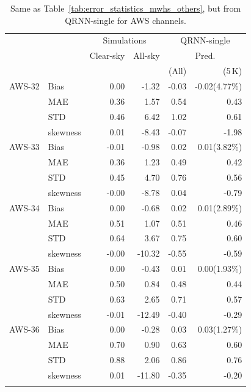 \documentclass[amt, manuscript]{copernicus}
\begin{document}
\begin{table}[t]
	\caption{Same as Table~\ref{tab:error_statistics_mwhs_others}, but from QRNN-single for AWS channels. }
	\label{tab:statistics_qrnn_aws}
	\begin{tabular}{llrr|rr}
		\tophline
		&&\multicolumn{2}{c|}{Simulations}& \multicolumn{2}{c}{QRNN-single} \\
		\cline{3-6}
		&&Clear-sky &   All-sky &  \multicolumn{2}{c}{Pred.}  \\
		&&   &    &   (All) & (5\,K) \\
		\middlehline
		AWS-32  &Bias      & 0.00 & -1.32 &  -0.03 & -0.02(4.77\%) \\
				&MAE      & 0.36 &  1.57 &   0.54 &  0.43 \\
				&STD      & 0.46 &  6.42 &   1.02 &  0.61 \\
				&skewness & 0.01 & -8.43 &  -0.07 & -1.98 \\
		\middlehline
		AWS-33	&Bias      & -0.01 & -0.98 &  0.02 &  0.01(3.82\%) \\
				&MAE      &  0.36 &  1.23 &  0.49 &  0.42 \\
				&STD      &  0.45 &  4.70 &  0.76 &  0.56 \\
				&skewness & -0.00 & -8.78 &  0.04 & -0.79 \\
		
		\middlehline
		AWS-34	&Bias      &  0.00 &  -0.68 &  0.02 &  0.01(2.89\%) \\
				&MAE      &  0.51 &   1.07 &  0.51 &  0.46 \\
				&STD      &  0.64 &   3.67 &  0.75 &  0.60 \\
				&skewness & -0.00 & -10.32 & -0.55 & -0.59 \\
		\middlehline
		AWS-35	&Bias      &  0.00 &  -0.43 &  0.01 &  0.00(1.93\%) \\
				&MAE      &  0.50 &   0.84 &  0.48 &  0.44 \\
				&STD      &  0.63 &   2.65 &  0.71 &  0.57 \\
				&skewness & -0.01 & -12.49 & -0.40 & -0.29 \\
		\middlehline
		AWS-36  &Bias      & 0.00 &  -0.28 &   0.03  &  0.03(1.27\%) \\
				&MAE       & 0.70 &   0.90 &   0.63  &  0.60 \\
				&STD      & 0.88 &   2.06 &   0.86  &  0.76 \\
				&skewness & 0.01 & -11.80 &  -0.35  & -0.20 \\
		\bottomhline				
	\end{tabular}
	\belowtable{} %
\end{table}
\end{document}

